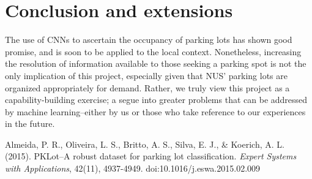 \documentclass[a4paper, 11pt]{article} %
\begin{document}
\section{Conclusion and extensions}
The use of CNNs to ascertain the occupancy of parking lots has shown good promise, and is soon 
to be applied to the local context. Nonetheless, increasing the resolution of information available to 
those seeking a parking spot is not the only implication of this project, especially given that NUS' 
parking lots are organized appropriately for demand. Rather, we truly view this project as a 
capability-building exercise; a segue into greater problems that can be addressed by machine 
learning--either by us or those who take reference to our experiences in the future.

\newpage
\begin{thebibliography}{unsrt}
		Almeida, P. R., Oliveira, L. S., Britto, A. S., Silva, E. J., \& Koerich, A. L. (2015). PKLot--A robust 
		dataset for parking lot classification. \textit{Expert Systems with Applications}, 42(11), 
		4937-4949. doi:10.1016/j.eswa.2015.02.009
\end{thebibliography}
\end{document}
